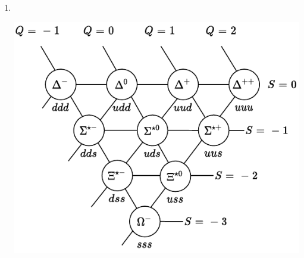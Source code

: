 \documentclass{homework}
\newcommand{\1}{\mathds{1}}
\begin{document}
\begin{enumerate}[label={\arabic*.}]
		\clearpage
		\item ~\vspace{0.1em} \\ \begin{center}
			\includegraphics[width=0.7\linewidth]{baryon}
		\end{center}
		

\end{enumerate}
\end{document}
